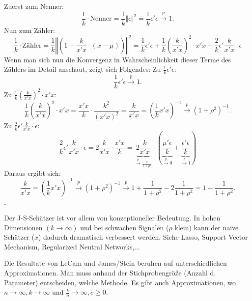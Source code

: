 \documentclass[10pt]{article}
\newcommand{\KW}{\overset{p} \longrightarrow} %
\newenvironment{BWS}[1][]
{\begin{Beweis}[frametitle=#1]}{\end{Beweis}}
\begin{document}
	
	\begin{BWS}[Beweis 1.5.1]
		Zuerst zum Nenner:
		\begin{equation*}
			\frac{1}{k} \cdot \text{Nenner} = \frac{1}{k} \Vert \epsilon \Vert^2 = \frac{1}{k} \epsilon'\epsilon \KW 1.
		\end{equation*}
		Nun zum Zähler:
		\begin{equation*}
			\frac{1}{k} \cdot \text{Zähler} = \frac{1}{k} \left\Vert \left( 1 - \frac{k}{x'x} \cdot (x-\mu) \right) \right\Vert^2 = \frac{1}{k} \epsilon' \epsilon + \frac{1}{k} \left(\frac{k}{x'x}\right)^2 \cdot x'x - \frac{2}{k} \epsilon' \frac{k}{x'x} \cdot \epsilon
		\end{equation*}
		Wenn man sich nun die Konvergenz in Wahrscheinlichkeit dieser Terme des Zählers im Detail anschaut, zeigt sich Folgendes:
		Zu $\frac{1}{k} \epsilon' \epsilon$:
		\begin{equation*}
			\frac{1}{k} \epsilon' \epsilon \KW 1.
		\end{equation*}
		Zu $\frac{1}{k} \left(\frac{k}{x'x}\right)^2 \cdot x'x$:
		\begin{equation*}
			\frac{1}{k} \left(\frac{k}{x'x}\right)^2 \cdot x'x = \frac{x'x}{k} \cdot \frac{k^2}{(x'x)^2} = \frac{k}{x'x} = \left(\frac{1}{k} x'x\right)^{-1} \KW (1+\rho^2)^{-1}.
		\end{equation*}
		Zu $\frac{2}{k} \epsilon' \frac{k}{x'x} \cdot \epsilon$:
		\begin{equation*}
			\frac{2}{k} \epsilon' \frac{k}{x'x} \cdot \epsilon = 2 \frac{k}{x'x} \cdot \frac{x'x}{k} = \underbrace{2 \frac{k}{x'x}}_{\KW \frac{1}{1+\rho^2}} \cdot (\underbrace{\frac{\mu' \epsilon}{k}}_{\KW 0} + \underbrace{\frac{\epsilon'\epsilon}{k}}_{\KW 1})
		\end{equation*}
		Daraus ergibt sich:
		\begin{equation*}
			\frac{k}{x'x} = \left(\frac{1}{k} x'x\right)^{-1} \KW (1+\rho^2)^{-1} \KW 1 + \frac{1}{1+ \rho^2} - 2\frac{1}{1+\rho^2} = 1- \frac{1}{1+\rho^2}.
		\end{equation*}
		\begin{flushright}
			$\square$
		\end{flushright}
	\end{BWS}
	
	\begin{Bemerkung}
		Der J-S-Schätzer ist vor allem von konzeptioneller Bedeutung. In hohen Dimensionen $(k \rightarrow \infty)$ und bei schwachen Signalen ($\rho$ klein) kann der naive Schätzer ($x$) dadurch dramatisch verbessert werden. Siehe Lasso, Support Vector Mechanism, Regularized Neutral Networks,...
		
		Die Resultate von LeCam und James/Stein beruhen auf unterschiedlichen Approximationen. Man muss anhand der Stichprobengröße (Anzahl d. Parameter) entscheiden, welche Methode. Es gibt auch Approximationen, wo $ n \rightarrow \infty, k \rightarrow \infty$ und $\frac{k}{n} \rightarrow \infty, c \geq 0$. 
	\end{Bemerkung}
\end{document}
